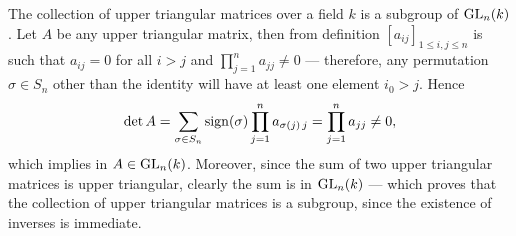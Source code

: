 \begin{example}
\label{exp:upper-triangular-GL-subgroup}
The collection of upper triangular matrices over a field \(k\) is a subgroup of
\(\operatorname{GL}_n(k)\). Let \(A\) be any upper triangular matrix, then from definition
\([a_{ij}]_{1 \leq i, j \leq n}\) is such that \(a_{ij} = 0\) for all \(i > j\)
and \(\prod_{j=1}^n a_{jj} \neq 0\) --- therefore, any permutation \(\sigma \in
S_n\) other than the identity will have at least one element \(i_0 > j\). Hence
\[
\det A = \sum_{\sigma \in S_n} \operatorname{sign}(\sigma) \prod_{j=1}^n a_{\sigma(j)\, j}
= \prod_{j=1}^n a_{j j}
\neq 0,
\]
which implies in \(A \in \operatorname{GL}_n(k)\). Moreover, since the sum of two upper
triangular matrices is upper triangular, clearly the sum is in \(\operatorname{GL}_n(k)\) ---
which proves that the collection of upper triangular matrices is a subgroup,
since the existence of inverses is immediate.
\end{example}

